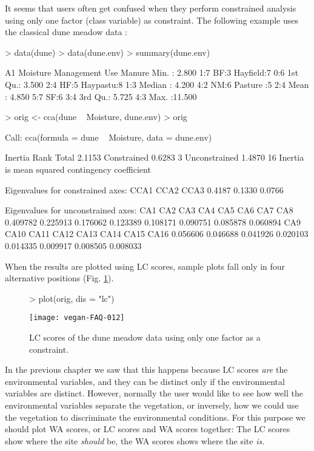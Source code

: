 \documentclass[a4paper]{article}
\begin{document}
It seems that users often get confused when they perform constrained
analysis using  only one factor (class variable) as constraint.  The
following example uses the classical dune meadow data \cite{Jongman87}:
\begin{Schunk}
\begin{Sinput}
> data(dune)
> data(dune.env)
> summary(dune.env)
\end{Sinput}
\begin{Soutput}
       A1         Moisture Management       Use    Manure
 Min.   : 2.800   1:7      BF:3       Hayfield:7   0:6   
 1st Qu.: 3.500   2:4      HF:5       Haypastu:8   1:3   
 Median : 4.200   4:2      NM:6       Pasture :5   2:4   
 Mean   : 4.850   5:7      SF:6                    3:4   
 3rd Qu.: 5.725                                    4:3   
 Max.   :11.500                                          
\end{Soutput}
\begin{Sinput}
> orig <- cca(dune ~ Moisture, dune.env)
> orig
\end{Sinput}
\begin{Soutput}
Call:
cca(formula = dune ~ Moisture, data = dune.env) 

              Inertia Rank
Total          2.1153     
Constrained    0.6283    3
Unconstrained  1.4870   16
Inertia is mean squared contingency coefficient 

Eigenvalues for constrained axes:
  CCA1   CCA2   CCA3 
0.4187 0.1330 0.0766 

Eigenvalues for unconstrained axes:
     CA1      CA2      CA3      CA4      CA5      CA6      CA7      CA8 
0.409782 0.225913 0.176062 0.123389 0.108171 0.090751 0.085878 0.060894 
     CA9     CA10     CA11     CA12     CA13     CA14     CA15     CA16 
0.056606 0.046688 0.041926 0.020103 0.014335 0.009917 0.008505 0.008033 
\end{Soutput}
\end{Schunk}
When the results are plotted using LC scores, sample plots fall only
in four alternative positions (Fig. \ref{fig:factorlc}).
\begin{figure}
\begin{center}
\begin{Schunk}
\begin{Sinput}
> plot(orig, dis = "lc")
\end{Sinput}
\end{Schunk}
\texttt{[image: vegan-FAQ-012]}
\caption{LC scores of the dune meadow data using only one factor as a
  constraint.}
\label{fig:factorlc}
\end{center}
\end{figure}
In the previous chapter we saw that this happens because LC scores
\emph{are} the environmental variables, and they can be distinct only
if the environmental variables are distinct.  However, normally the user
would like to see how well the environmental variables separate the
vegetation, or inversely, how we could use the vegetation to
discriminate the environmental conditions.  For this purpose we should
plot WA scores, or LC scores and WA scores together:  The LC scores
show where the site \emph{should} be, the WA scores shows where the
site \emph{is}.
\end{document}

